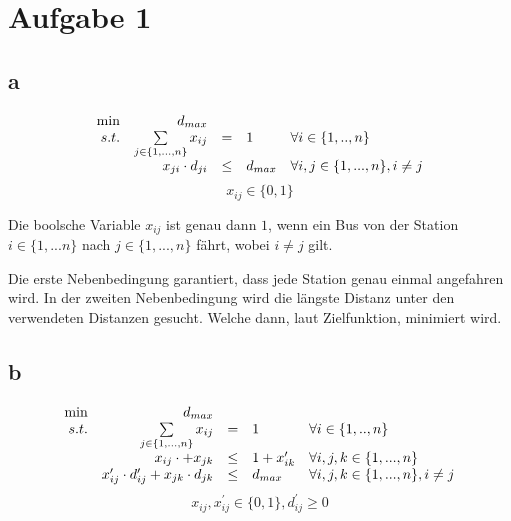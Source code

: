 \documentclass[10pt]{article}
\begin{document}
  \section*{Aufgabe 1}
    \subsection*{a}
      \begin{displaymath}
        \begin{array}{ r r c l l }
          \min & d_{max} & & & \\
          s.t. & \sum\limits_{j\in \{1,...,n\}} x_{ij} & = & 1 & \forall 
            i\in \{1,..,n\}\\
            & x_{ji}\cdot d_{ji} &\leq& d_{max} & \forall i,j \in \{1,...,n\}, i\neq j \\
        \end{array}
      \end{displaymath}
      \begin{displaymath}
        x_{ij}\in\{0,1\}
      \end{displaymath}

      Die boolsche Variable $x_{ij}$ ist genau dann $1$, wenn ein Bus von der
      Station $i\in \{1,...n\}$ nach $j \in \{1,...,n\}$ fährt, wobei $i\neq j$
      gilt.

      Die erste Nebenbedingung garantiert, dass jede Station genau einmal angefahren
      wird. In der zweiten Nebenbedingung wird die längste Distanz unter den
      verwendeten Distanzen gesucht. Welche dann, laut Zielfunktion, minimiert
      wird.

    \subsection*{b}
      \begin{displaymath}
        \begin{array}{ r r c l l }
          \min & d_{max} & & & \\
          s.t. & \sum\limits_{j\in \{1,...,n\}} x_{ij} & = & 1 & \forall 
            i\in \{1,..,n\}\\
            & x_{ij}\cdot + x_{jk} & \leq &1 + x_{ik}^{\prime} & \forall
                i,j,k \in \{1,...,n\} \\
            & x_{ij}^{\prime}\cdot d_{ij}^{\prime} + x_{jk} \cdot d_{jk}&\leq&
              d_{max} & \forall i,j,k \in \{1,...,n\}, i\neq j \\
        \end{array}
      \end{displaymath}
      \begin{displaymath}
        x_{ij},x_{ij}^{\prime}\in\{0,1\}, d_{ij}^{\prime} \geq 0
      \end{displaymath}
\end{document}
